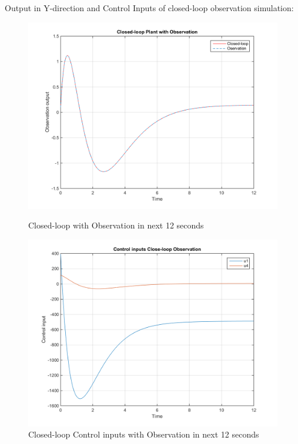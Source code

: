 \documentclass[14pt,a4paper]{article}
\begin{document}
Output in Y-direction and Control Inputs of closed-loop observation simulation: 
\begin{figure}[htp]
	\begin{center}
		\includegraphics[scale = 0.55]{ClosedLoopObservation.png}
		\caption{Closed-loop with Observation in next 12 seconds}
		\includegraphics[scale = 0.55]{ClosedLoopControlInput.png}
		\caption{Closed-loop Control inputs with Observation in next 12 seconds}
	\end{center}
\end{figure} \\
\pagebreak
\end{document}
